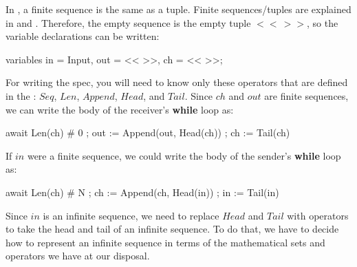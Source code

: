 \documentclass[fleqn,leqno]{article}
\begin{document}
In \tlaplus, a finite
sequence is the same as a
tuple.  Finite sequences/tuples are explained in 
and
  .
Therefore, the empty sequence is the empty tuple $<<\,>>$, so the variable
declarations can be written:
\begin{display}
\begin{nopcal}
variables in = Input, out = << >>, ch = << >>;
\end{nopcal}
\begin{tlatex}
\end{tlatex}
\end{display}
For writing the spec, you will need to know only these
operators that are defined in  the 
  :
$Seq$, $Len$, $Append$, $Head$, and $Tail$.  Since $ch$ and $out$ are
finite sequences, we can write the body of the receiver's \textbf{while}
loop as:
%
\begin{display}
\begin{nopcal}
await Len(ch) # 0 ;
out := Append(out, Head(ch)) ;
ch := Tail(ch)
\end{nopcal}
\begin{tlatex}
%
%
%
\end{tlatex}
\end{display}
If $in$ were a finite sequence, we could write the body of the sender's
\textbf{while} loop as:
\begin{display}
\begin{nopcal}
await Len(ch) # N ;
ch := Append(ch, Head(in)) ;
in := Tail(in)
\end{nopcal}
\begin{tlatex}
%
%
%
\end{tlatex}
\end{display}
Since $in$ is an infinite sequence, we need to replace $Head$ and $Tail$
with operators to take the head and tail of an infinite sequence.  To do
that, we have to decide how to represent an infinite sequence in terms of
the mathematical sets and operators we have at our disposal.  
\end{document}
